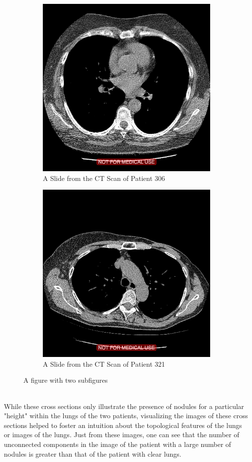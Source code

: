 \documentclass[12pt]{report}
\begin{document}
\begin{figure}
\centering
\begin{subfigure}{.5\textwidth}
  \centering
  \includegraphics[width=0.8\linewidth]{306example}
  \caption{A Slide from the CT Scan of Patient 306}
  \label{fig:sub1}
\end{subfigure}%
\begin{subfigure}{.5\textwidth}
  \centering
  \includegraphics[width=0.8\linewidth]{321example}
  \caption{A Slide from the CT Scan of Patient 321}
  \label{fig:sub2}
\end{subfigure}
\caption{A figure with two subfigures}
\label{fig:test}
\end{figure}\newline
\\
While these cross sections only illustrate the presence of nodules for a particular "height" within the lungs of the two patients, visualizing the images of these cross sections helped to foster an intuition about the topological features of the lungs or images of the lungs. Just from these images, one can see that the number of unconnected components in the image of the patient with a large number of nodules is greater than that of the patient with clear lungs.
\end{document}
